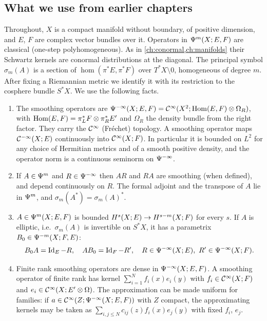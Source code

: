 \subsection{What we use from earlier chapters}
Throughout, $X$ is a compact manifold without boundary, of positive dimension,
and $E$, $F$ are complex vector bundles over it. Operators in
$\Psi^{m}(X;E,F)$ are classical (one-step polyhomogeneous). As in
\cref{ch:conormal,ch:manifolds} their Schwartz kernels are conormal
distributions at the diagonal. The principal symbol $\sigma_m(A)$ is a
section of $\hom(\pi^*E,\pi^*F)$ over $T^*X\setminus0$, homogeneous of degree
$m$. After fixing a Riemannian metric we identify it with its restriction to
the cosphere bundle $S^*X$. We use the following facts.
\begin{enumerate}[label=(\roman*)]
\item The smoothing operators are
  $\Psi^{-\infty}(X;E,F)=\mathcal{C}^\infty(X^2;\operatorname{Hom}(E,F)\otimes\Omega_R)$, with
  $\operatorname{Hom}(E,F)=\pi_L^*F\otimes\pi_R^*E'$ and $\Omega_R$ the density bundle
  from the right factor. They carry the $\mathcal{C}^\infty$ (Fr\'echet) topology. A
  smoothing operator maps $\mathcal{C}^{-\infty}(X;E)$ continuously into $\mathcal{C}^\infty(X;F)$. In
  particular it is bounded on $L^2$ for any choice of Hermitian metrics and of a
  smooth positive density, and the operator norm is a continuous seminorm on
  $\Psi^{-\infty}$.
\item If $A\in\Psi^{m}$ and $R\in\Psi^{-\infty}$ then $AR$ and $RA$ are
  smoothing (when defined), and depend continuously on $R$. The formal
  adjoint and the transpose of $A$ lie in $\Psi^{m}$, and
  $\sigma_m(A^*)=\sigma_m(A)^*$.
\item $A\in\Psi^{m}(X;E,F)$ is bounded $H^{s}(X;E)\to H^{s-m}(X;F)$ for
  every $s$. If $A$ is elliptic, i.e.\ $\sigma_m(A)$ is invertible on $S^*X$,
  it has a parametrix $B_0\in\Psi^{-m}(X;F,E)$:
  \begin{equation}\label{index:eq:parametrix}
    B_0A=\operatorname{Id}_E-R,\quad AB_0=\operatorname{Id}_F-R',\quad R\in\Psi^{-\infty}(X;E),\
    R'\in\Psi^{-\infty}(X;F).
  \end{equation}
\item Finite rank smoothing operators are dense in $\Psi^{-\infty}(X;E,F)$.
  A smoothing operator of finite rank has kernel
  $\sum_{i=1}^Nf_i(x)e_i(y)$ with $f_i\in\mathcal{C}^\infty(X;F)$ and
  $e_i\in\mathcal{C}^\infty(X;E'\otimes\Omega)$. The approximation can be made uniform for
  families: if $a\in\mathcal{C}^\infty(Z;\Psi^{-\infty}(X;E,F))$ with $Z$ compact, the
  approximating kernels may be taken as $\sum_{i,j\le N}c_{ij}(z)f_i(x)e_j(y)$
  with fixed $f_i$, $e_j$.

\end{enumerate}
